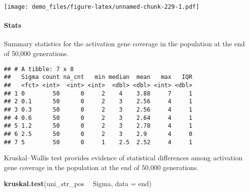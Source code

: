 \documentclass[]{book}
\newenvironment{Shaded}{\begin{snugshade}}{\end{snugshade}}
\newcommand{\DataTypeTok}[1]{\textcolor[rgb]{0.13,0.29,0.53}{#1}}
\newcommand{\KeywordTok}[1]{\textcolor[rgb]{0.13,0.29,0.53}{\textbf{#1}}}
\newcommand{\NormalTok}[1]{#1}
\newcommand{\OperatorTok}[1]{\textcolor[rgb]{0.81,0.36,0.00}{\textbf{#1}}}
\newcommand{\OtherTok}[1]{\textcolor[rgb]{0.56,0.35,0.01}{#1}}
\newcommand{\StringTok}[1]{\textcolor[rgb]{0.31,0.60,0.02}{#1}}
\let\oldparagraph\paragraph
\renewcommand{\paragraph}[1]{\oldparagraph{#1}\mbox{}}
\begin{document}
\texttt{[image: demo\_files/figure-latex/unnamed-chunk-229-1.pdf]}

\hypertarget{stats-44}{%
\paragraph{Stats}\label{stats-44}}

Summary statistics for the activation gene coverage in the population at the end of 50,000 generations.

\begin{Shaded}
\end{Shaded}

\begin{verbatim}
## # A tibble: 7 x 8
##   Sigma count na_cnt   min median  mean   max   IQR
##   <fct> <int>  <int> <int>  <dbl> <dbl> <int> <dbl>
## 1 0        50      0     2    4    3.88     7     1
## 2 0.1      50      0     2    3    2.56     4     1
## 3 0.3      50      0     2    3    2.56     4     1
## 4 0.6      50      0     2    3    2.64     4     1
## 5 1.2      50      0     2    3    2.78     4     1
## 6 2.5      50      0     2    3    2.9      4     0
## 7 5        50      0     1    2.5  2.52     4     1
\end{verbatim}

Kruskal--Wallis test provides evidence of statistical differences among activation gene coverage in the population at the end of 50,000 generations.

\begin{Shaded}
\begin{Highlighting}[]
\KeywordTok{kruskal.test}\NormalTok{(uni_str_pos }\OperatorTok{~}\StringTok{ }\NormalTok{Sigma, }\DataTypeTok{data =}\NormalTok{ end)}
\end{Highlighting}
\end{Shaded}
\end{document}
